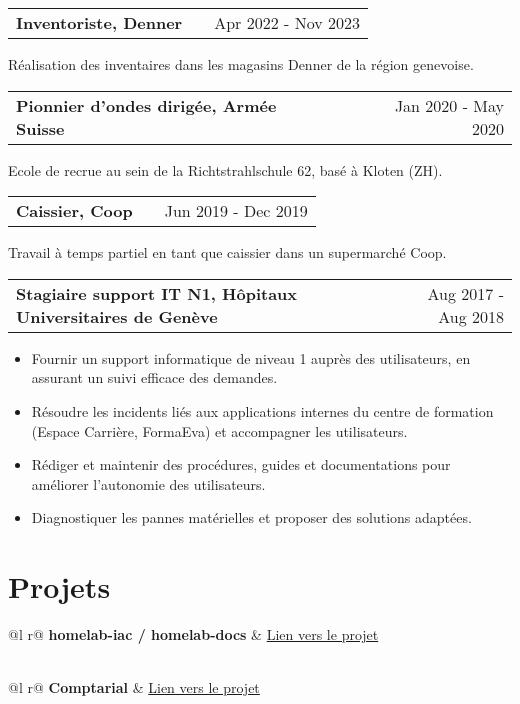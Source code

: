 \documentclass[a4paper,12pt]{article}
\makeatletter
\newenvironment{jobshort}[2]
    {
    \begin{tabularx}{\linewidth}{@{}l X r@{}}
    \textbf{#1} & \hfill &  #2 \\[3.75pt]
    \end{tabularx}
    }
    {
    }
\newenvironment{joblong}[2]
    {
    \begin{tabularx}{\linewidth}{@{}l X r@{}}
    \textbf{#1} & \hfill &  #2 \\[3.75pt]
    \end{tabularx}
    \begin{minipage}[t]{\linewidth}
    \begin{itemize}[nosep,after=\strut, leftmargin=1em, itemsep=3pt,label=--]
    }
    {
    \end{itemize}
    \end{minipage}
    }
\makeatother
\begin{document}
\begin{jobshort}{Inventoriste, Denner}{Apr 2022 - Nov 2023}
    Réalisation des inventaires dans les magasins Denner de la région genevoise.
\end{jobshort}

\begin{jobshort}{Pionnier d’ondes dirigée, Armée Suisse}{Jan 2020 - May 2020}
    Ecole de recrue au sein de la Richtstrahlschule 62, basé à Kloten (ZH).
\end{jobshort}

\begin{jobshort}{Caissier, Coop}{Jun 2019 - Dec 2019}
    Travail à temps partiel en tant que caissier dans un supermarché Coop.
\end{jobshort}

\begin{joblong}{Stagiaire support IT N1, Hôpitaux Universitaires de Genève}{Aug 2017 - Aug 2018}
\item Fournir un support informatique de niveau 1 auprès des utilisateurs, en assurant un suivi efficace des demandes.
\item Résoudre les incidents liés aux applications internes du centre de formation (Espace Carrière, FormaEva) et accompagner les utilisateurs.
\item Rédiger et maintenir des procédures, guides et documentations pour améliorer l’autonomie des utilisateurs.
\item Diagnostiquer les pannes matérielles et proposer des solutions adaptées.
\end{joblong}

\section{Projets}

\begin{tabularx}{\linewidth}{ @{}l r@{} }
\textbf{homelab-iac / homelab-docs} & \hfill \href{https://boranuzun.github.io/homelab-docs}{Lien vers le projet} \\[3.75pt]
  \\
\end{tabularx}

\begin{tabularx}{\linewidth}{ @{}l r@{} }
\textbf{Comptarial} & \hfill \href{https://github.com/heg-comptarial/comptarial}{Lien vers le projet} \\[3.75pt]
  \\
\end{tabularx}
\end{document}
